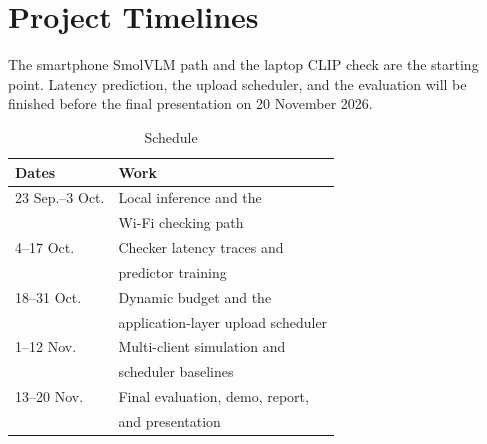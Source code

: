 \section{Project Timelines}

The smartphone SmolVLM path and the laptop CLIP check are the starting
point. Latency prediction, the upload scheduler, and the evaluation will be
finished before the final presentation on 20 November 2026.

\begin{table}[t]
\caption{Schedule}
\label{tab:schedule}
\centering
\begin{tabular}{ll}
\hline
Dates & Work \\
\hline
23 Sep.--3 Oct. &
Local inference and the \\
&
Wi-Fi checking path \\

4--17 Oct. &
Checker latency traces and \\
&
predictor training \\

18--31 Oct. &
Dynamic budget and the \\
&
application-layer upload scheduler \\

1--12 Nov. &
Multi-client simulation and \\
&
scheduler baselines \\

13--20 Nov. &
Final evaluation, demo, report, \\
&
and presentation \\
\hline
\end{tabular}
\end{table}